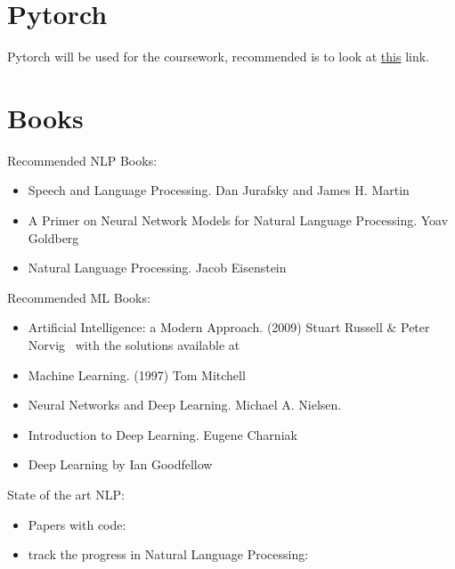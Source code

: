 \documentclass[11pt]{article}
\begin{document}


\tableofcontents

\section{Pytorch}

Pytorch will be used for the coursework, recommended is to look at \href{https://pytorch.org/tutorials/beginner/deep_learning_60min_blitz.html}{this} link.

\section{Books}

Recommended NLP Books:

\begin{itemize}
    \item Speech and Language Processing. Dan Jurafsky and James H. Martin~\cite{book-speech-and-language-processing}
    \item A Primer on Neural Network Models for Natural Language Processing.
          Yoav Goldberg~\cite{primer-on-nlp}
    \item Natural Language Processing. Jacob Eisenstein~\cite{git-natural-language-processing}
\end{itemize}

Recommended ML Books:

\begin{itemize}
    \item Artificial Intelligence: a Modern Approach. (2009) Stuart Russell \& Peter Norvig~\cite{AI-modern-approach} with the solutions available at~\cite{AI-modern-approach-slutions}
    \item Machine Learning. (1997) Tom Mitchell~\cite{tom-mitchell-book}
    \item Neural Networks and Deep Learning. Michael A. Nielsen.
    \item Introduction to Deep Learning. Eugene Charniak~\cite{intro-to-dl-eugene-charniak}
    \item Deep Learning by Ian Goodfellow~\cite{Goodfellow-et-al-2016}
\end{itemize}

State of the art NLP:

\begin{itemize}
    \item Papers with code:~\cite{papers-with-code}
    \item  track the progress in Natural Language Processing:~\cite{track-progress-nlp}
\end{itemize}

\printbibliography
\end{document}
